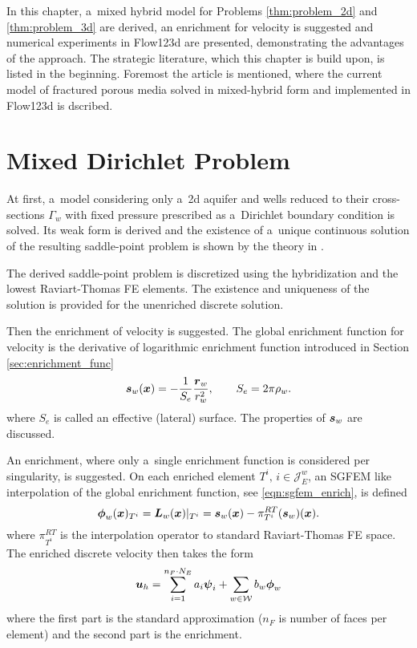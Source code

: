 
In this chapter, a~mixed hybrid model for Problems \ref{thm:problem_2d} and \ref{thm:problem_3d} are derived,
an enrichment for velocity is suggested and numerical experiments in Flow123d are presented, demonstrating
the advantages of the approach.
The strategic literature, which this chapter is build upon, is listed in the beginning.
Foremost the article \cite{sistek_bddc_2015} is mentioned, where the current model 
of fractured porous media solved in mixed-hybrid form and implemented in Flow123d is dscribed.


\section{Mixed Dirichlet Problem}
At first, a~model considering only a~2d aquifer and wells reduced to their cross-sections $\Gamma_w$
with fixed pressure prescribed as a~Dirichlet boundary condition is solved.
Its weak form is derived and the existence of a~unique continuous solution of the resulting saddle-point
problem is shown by the theory in \cite{brezzi_mixed_1991}.

The derived saddle-point problem is discretized using the hybridization and the lowest Raviart-Thomas FE elements.
The existence and uniqueness of the solution is provided for the unenriched discrete solution.

Then the enrichment of velocity is suggested.
The global enrichment function for velocity is the derivative of logarithmic enrichment function introduced in Section \ref{sec:enrichment_func}
\begin{equation}
    \mathbf{\boldsymbol{s}}_w(\mathbf{\boldsymbol{x}}) = -\frac{1}{S_e} \frac{\mathbf{\boldsymbol{r}}_w}{r_w^2}, \qquad S_e = 2\pi\rho_w.
\end{equation}
where $S_e$ is called an effective (lateral) surface.
The properties of $\mathbf{\boldsymbol{s}}_w$ are discussed.

An enrichment, where only a~single enrichment function is considered per singularity, is suggested.
On each enriched element $T^i,\, i\in\mathcal{J}^w_E$, an SGFEM like interpolation 
of the global enrichment function, see \eqref{eqn:sgfem_enrich}, is defined
\begin{equation}
    \mathbf{\boldsymbol{\phi}}_w(\mathbf{\boldsymbol{x}})_{T^i} = \mathbf{\boldsymbol{L}}_{w}(\mathbf{\boldsymbol{x}})|_{T^i} = \mathbf{\boldsymbol{s}}_w(\mathbf{\boldsymbol{x}}) - \pi^{RT}_{T^i}(\mathbf{\boldsymbol{s}}_w)(\mathbf{\boldsymbol{x}}).
    \label{eqn:local_enr_vel}
\end{equation}
where $\pi^{RT}_{T^i}$ is the interpolation operator to standard Raviart-Thomas FE space.
The enriched discrete velocity then takes the form
\begin{equation}
    \mathbf{\boldsymbol{u}}_h = 
    \sum \limits_{i=1}^{n_F\cdot N_E} a_i \mathbf{\boldsymbol{\psi}}_i + 
    \sum \limits_{w\in\mathcal{W}} b_w \mathbf{\boldsymbol{\phi}}_w
    \label{eqn:velocity_enriched_approximation}
\end{equation}
where the first part is the standard approximation ($n_F$ is number of faces per element)
and the second part is the enrichment.

